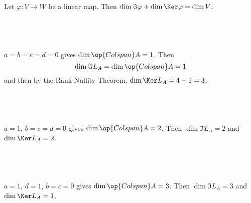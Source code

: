 \documentclass[a4paper]{article}
\begin{document}
Let $\varphi : V \to W$ be a linear map. Then $\dim \Im \varphi + \dim \Ker \varphi = \dim V$.

\subsection{~}

$a = b = c = d = 0$ gives $\dim \op{Colspan} A = 1$. Then $$\dim \Im L_A = \dim \op{Colspan} A = 1$$
and then by the Rank-Nullity Theorem, $\dim \Ker L_A = 4 - 1 = 3$.

\subsection{~}

$a = 1$, $b = c = d = 0$ gives $\dim \op{Colspan} A = 2$. Then $\dim \Im L_A = 2$ and $\dim \Ker L_A = 2$.

\subsection{~}

$a = 1$, $d = 1$, $b = c = 0$ gives $\dim \op{Colspan} A = 3$. Then $\dim \Im L_A = 3$ and $\dim \Ker L_A = 1$.

\end{document}
